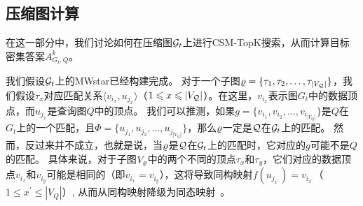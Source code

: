 \subsection{压缩图计算}
在这一部分中，我们讨论如何在压缩图$\mathcal{G}_t$上进行CSM-TopK搜索，从而计算目标密集答案$A_{G_t, Q}^k$。

我们假设$\mathcal{G}_t$上的MWstar已经构建完成。
对于一个子图$\varrho = \{\tau_1, \tau_2, \dots, \tau_{|V_{\mathcal{Q}}|}\}$，我们假设$\tau_x$对应匹配关系$\langle v_{i_x}, u_{j_x} \rangle$（$1 \leqslant x \leqslant |V_{\mathcal{Q}}|$）。在这里，$v_{i_x}$表示图$G_t$中的数据顶点，而$u_{j_x}$是查询图$Q$中的顶点。
我们可以推测，如果$g = \{v_{i_1}, v_{i_2}, \dots, v_{i_{|V_Q|}}\}$是$Q$在$G_t$上的一个匹配，且$\Phi = \{u_{j_1}, u_{j_2}, \dots, u_{j_{|V_Q|}}\}$，那么$\varrho$一定是$\mathcal{Q}$在$\mathcal{G}_t$上的匹配。
然而，反过来并不成立，也就是说，当$\varrho$是$\mathcal{Q}$在$\mathcal{G}_t$上的匹配时，它对应的$g$可能不是$Q$的匹配。
具体来说，对于子图$V_{\varrho}$中的两个不同的顶点$\tau_x$和$\tau_y$，它们对应的数据顶点$v_{i_x}$和$v_{i_y}$可能是相同的（即$v_{i_x} = v_{i_y}$），这将导致同构映射$f(u_{j_{x^\prime}}) = v_{i_{x^\prime}}$（$1 \leq x^\prime \leq |V_Q|$）, 从而从同构映射降级为同态映射~\cite{homomorphism-DBLP:conf/soda/CyganFGKMPS16}。

